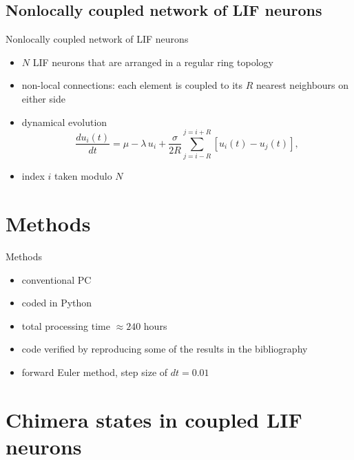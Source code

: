 \documentclass{beamer}
\begin{document}
\subsection{Nonlocally coupled network of LIF neurons}
\begin{frame}{Nonlocally coupled network of LIF neurons} \pause
  \begin{itemize}
  \item $N$ LIF neurons that are arranged in a regular ring topology \pause
  \item non-local connections: each element is coupled to its $R$ nearest neighbours on either side \pause
  \item dynamical evolution
  \begin{equation} \label{eqncon}
\frac{d u_i(t)}{dt} = \mu - \lambda \, u_i + \frac{\sigma}{2 R} \sum_{j=i-R}^{j=i+R} [u_i(t) - u_j(t)],
\end{equation} \pause
\item index $i$ taken modulo $N$ 
  \end{itemize}
\end{frame}

\section{Methods}
\begin{frame}{Methods} \pause
\begin{itemize}
\item conventional PC \pause
\item coded in Python \pause
\item total processing time $\approx 240$ hours \pause
\item code verified by reproducing some of the results in the bibliography \pause
\item forward Euler method, step size of $dt = 0.01$

\end{itemize}
\end{frame}

\section{Chimera states in coupled LIF neurons}
\end{document}
